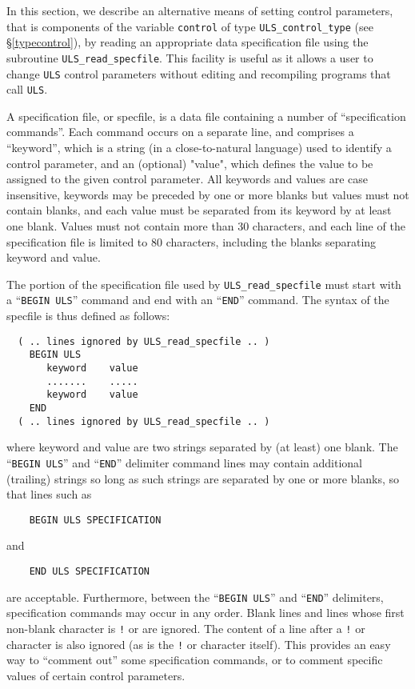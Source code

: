 \documentclass{galahad}
\newcommand{\packagename}{ULS}
\begin{document}

\galcontrolfeatures
\noindent In this section, we describe an alternative means of setting 
control parameters, that is components of the variable {\tt control} of type
{\tt \packagename\_control\_type}
(see \S\ref{typecontrol}), 
by reading an appropriate data specification file using the
subroutine {\tt \packagename\_read\_specfile}. This facility
is useful as it allows a user to change  {\tt \packagename} control parameters 
without editing and recompiling programs that call {\tt \packagename}.

A specification file, or specfile, is a data file containing a number of 
``specification commands''. Each command occurs on a separate line, 
and comprises a ``keyword'', 
which is a string (in a close-to-natural language) used to identify a 
control parameter, and 
an (optional) "value", which defines the value to be assigned to the given
control parameter. All keywords and values are case insensitive, 
keywords may be preceded by one or more blanks but
values must not contain blanks, and
each value must be separated from its keyword by at least one blank.
Values must not contain more than 30 characters, and 
each line of the specification file is limited to 80 characters,
including the blanks separating keyword and value.

The portion of the specification file used by 
{\tt \packagename\_read\_specfile}
must start
with a ``{\tt BEGIN \packagename}'' command and end with an 
``{\tt END}'' command.  The syntax of the specfile is thus defined as follows:
\begin{verbatim}
  ( .. lines ignored by ULS_read_specfile .. )
    BEGIN ULS
       keyword    value
       .......    .....
       keyword    value
    END 
  ( .. lines ignored by ULS_read_specfile .. )
\end{verbatim}
where keyword and value are two strings separated by (at least) one blank.
The ``{\tt BEGIN \packagename}'' and ``{\tt END}'' delimiter command lines 
may contain additional (trailing) strings so long as such strings are 
separated by one or more blanks, so that lines such as
\begin{verbatim}
    BEGIN ULS SPECIFICATION
\end{verbatim}
and
\begin{verbatim}
    END ULS SPECIFICATION
\end{verbatim}
are acceptable. Furthermore, 
between the
``{\tt BEGIN \packagename}'' and ``{\tt END}'' delimiters,
specification commands may occur in any order.  Blank lines and
lines whose first non-blank character is {\tt !} or {\tt *} are ignored. 
The content 
of a line after a {\tt !} or {\tt *} character is also 
ignored (as is the {\tt !} or {\tt *}
character itself). This provides an easy way to ``comment out'' some 
specification commands, or to comment specific values 
of certain control parameters.  
\end{document}
